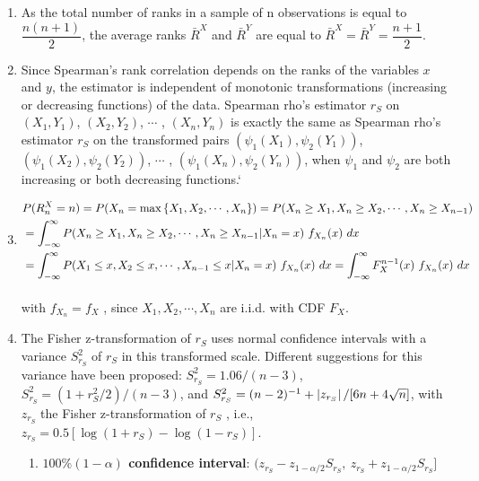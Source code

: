 \begin{enumerate}
    \item As the total number of ranks in a sample of n observations is equal to $\dfrac{n(n + 1)}{2}$, the average ranks $\bar{R}^X$ and $\bar{R}^Y$ are equal to $\bar{R}^X = \bar{R}^Y = \dfrac{n + 1}{2}$.
    \hfill \cite{statistics/book/Statistics-for-Data-Scientists/Maurits-Kaptein}

    \item Since Spearman’s rank correlation depends on the ranks of the variables $x$ and $y$, the estimator is independent of monotonic transformations (increasing or decreasing functions) of the data.
    Spearman rho’s estimator $r_S$ on $(X_1, Y_1)$, $(X_2, Y_2)$, $\cdots$ , $(X_n , Y_n )$ is exactly the same as Spearman rho’s estimator $r_S$ on the transformed pairs $(\psi_1(X_1), \psi_2(Y_1))$, $(\psi_1(X_2), \psi_2(Y_2))$, $\cdots$ , $(\psi_1(X_n ), \psi_2(Y_n ))$, when $\psi_1$ and $\psi_2$ are both increasing or both decreasing functions.`
    \hfill \cite{statistics/book/Statistics-for-Data-Scientists/Maurits-Kaptein}

    \item
    $
        \begin{aligned}
            &P(R^X_n = n)
            = P(X_n = \max\left\{X_1, X_2, \cdots , X_n \right\})
            = P(X_n \geq X_1, X_n \geq X_2, \cdots , X_n \geq X_{n-1}) \\
            &= \displaystyle\int_{-\infty}^\infty P(X_n \geq X_1, X_n \geq X_2, \cdots , X_n \geq X_{n-1}|X_n = x)\ f_{X_n} (x)\ dx  \\
            &= \displaystyle\int_{-\infty}^\infty P(X_1 \leq x, X_2 \leq x, \cdots , X_{n-1} \leq x|X_n = x)\ f_{X_n} (x)\ dx
            = \displaystyle\int_{-\infty}^\infty F^{n-1}_X (x)\ f_{X_n} (x)\ dx
        \end{aligned}
    $
    \hfill \cite{statistics/book/Statistics-for-Data-Scientists/Maurits-Kaptein}
    \\[0.3cm]
    with $f_{X_n} = f_X$ , since $X_1 , X_2, \cdots , X_n$ are i.i.d. with CDF $F_X $.
    \hfill \cite{statistics/book/Statistics-for-Data-Scientists/Maurits-Kaptein}

    \item The Fisher z-transformation of $r_S$ uses normal confidence intervals with a variance $S^2_{r_S}$ of $r_S$ in this transformed scale.
    Different suggestions for this variance have been proposed: $S^2_{r_S} = 1.06/(n - 3)$, $S^2_{r_S} = (1 + r^2_S /2)/(n - 3)$, and $S^2_{r_S} = (n - 2)^{-1} + \left| z_{r_S} \right|/[6n + 4\sqrt{n}]$, with $z_{r_S}$ the Fisher z-transformation of $r_S$ , i.e., $z_{r_S} = 0.5[\log(1 + r_S ) - \log(1 - r_S )]$.
    \hfill \cite{statistics/book/Statistics-for-Data-Scientists/Maurits-Kaptein}
    \begin{enumerate}
        \item \textbf{$100\%(1 - \alpha)$ confidence interval}:
        $ (z_{r_S} - z_{1-\alpha/2} S_{r_S} ,\ z_{r_S} + z_{1-\alpha/2} S_{r_S}] $
        \hfill \cite{statistics/book/Statistics-for-Data-Scientists/Maurits-Kaptein}


\end{enumerate}
\end{enumerate}
